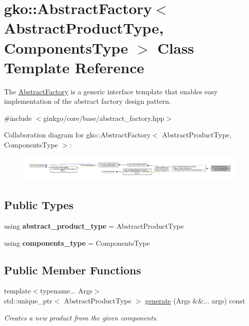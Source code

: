 \hypertarget{classgko_1_1AbstractFactory}{}\section{gko\+:\+:Abstract\+Factory$<$ Abstract\+Product\+Type, Components\+Type $>$ Class Template Reference}
\label{classgko_1_1AbstractFactory}


The \hyperlink{classgko_1_1AbstractFactory}{Abstract\+Factory} is a generic interface template that enables easy implementation of the abstract factory design pattern.  




{\ttfamily \#include $<$ginkgo/core/base/abstract\+\_\+factory.\+hpp$>$}



Collaboration diagram for gko\+:\+:Abstract\+Factory$<$ Abstract\+Product\+Type, Components\+Type $>$\+:
\nopagebreak
\begin{figure}[H]
\begin{center}
\leavevmode
\includegraphics[width=350pt]{classgko_1_1AbstractFactory__coll__graph}
\end{center}
\end{figure}
\subsection*{Public Types}
\begin{DoxyCompactItemize}
\item 
\mbox{\label{classgko_1_1AbstractFactory_afc8e23253c0fc2c81d6a74df19758454}} 
using {\bfseries abstract\+\_\+product\+\_\+type} = Abstract\+Product\+Type
\item 
\mbox{\label{classgko_1_1AbstractFactory_aca858cfbda0fb1e8df67eca429971c61}} 
using {\bfseries components\+\_\+type} = Components\+Type
\end{DoxyCompactItemize}
\subsection*{Public Member Functions}
\begin{DoxyCompactItemize}
\item 
{\footnotesize template$<$typename... Args$>$ }\\std\+::unique\+\_\+ptr$<$ Abstract\+Product\+Type $>$ \hyperlink{classgko_1_1AbstractFactory_a159c45f1db78b6b928d69cb9adf5c9ee}{generate} (Args \&\&... args) const
\begin{DoxyCompactList}\small\item\em Creates a new product from the given components. \end{DoxyCompactList}\end{DoxyCompactItemize}



